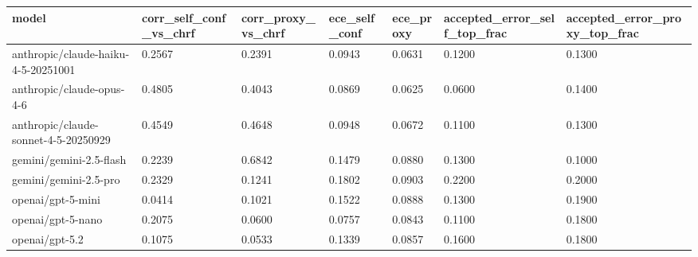 \begin{tabular}{lllllll}
\toprule
model & corr_self_conf_vs_chrf & corr_proxy_vs_chrf & ece_self_conf & ece_proxy & accepted_error_self_top_frac & accepted_error_proxy_top_frac \\
\midrule
anthropic/claude-haiku-4-5-20251001 & 0.2567 & 0.2391 & 0.0943 & 0.0631 & 0.1200 & 0.1300 \\
anthropic/claude-opus-4-6 & 0.4805 & 0.4043 & 0.0869 & 0.0625 & 0.0600 & 0.1400 \\
anthropic/claude-sonnet-4-5-20250929 & 0.4549 & 0.4648 & 0.0948 & 0.0672 & 0.1100 & 0.1300 \\
gemini/gemini-2.5-flash & 0.2239 & 0.6842 & 0.1479 & 0.0880 & 0.1300 & 0.1000 \\
gemini/gemini-2.5-pro & 0.2329 & 0.1241 & 0.1802 & 0.0903 & 0.2200 & 0.2000 \\
openai/gpt-5-mini & 0.0414 & 0.1021 & 0.1522 & 0.0888 & 0.1300 & 0.1900 \\
openai/gpt-5-nano & 0.2075 & 0.0600 & 0.0757 & 0.0843 & 0.1100 & 0.1800 \\
openai/gpt-5.2 & 0.1075 & 0.0533 & 0.1339 & 0.0857 & 0.1600 & 0.1800 \\
\bottomrule
\end{tabular}
